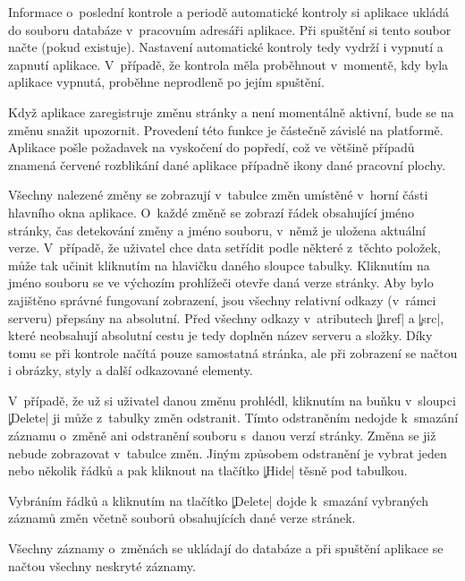 Informace o~poslední kontrole a periodě automatické kontroly si aplikace ukládá do souboru databáze v~pracovním adresáři aplikace.
Při spuštění si tento soubor načte (pokud existuje).
Nastavení automatické kontroly tedy vydrží i vypnutí a zapnutí aplikace.
V~případě, že kontrola měla proběhnout v~momentě, kdy byla aplikace vypnutá, proběhne neprodleně po jejím spuštění.

Když aplikace zaregistruje změnu stránky a není momentálně aktivní, bude se na změnu snažit upozornit.
Provedení této funkce je částečně závislé na platformě. 
Aplikace pošle požadavek na vyskočení do popředí, což ve většině případů znamená červené rozblikání dané aplikace případně ikony dané pracovní plochy.

Všechny nalezené změny se zobrazují v~tabulce změn umístěné v~horní části hlavního okna aplikace.
O~každé změně se zobrazí řádek obsahující jméno stránky, čas detekování změny a jméno souboru, v~němž je uložena aktuální verze.
V~případě, že uživatel chce data setřídit podle některé z~těchto položek, může tak učinit kliknutím na hlavičku daného sloupce tabulky.
Kliknutím na jméno souboru se ve výchozím prohlížeči otevře daná verze stránky.
Aby bylo zajištěno správné fungovaní zobrazení, jsou všechny relativní odkazy (v~rámci serveru) přepsány na absolutní.
Před všechny odkazy v~atributech \c|href| a \c|src|, které neobsahují absolutní cestu je tedy doplněn název serveru a složky.
Díky tomu se při kontrole načítá pouze samostatná stránka, ale při zobrazení se načtou i obrázky, styly a další odkazované elementy.

V~případě, že už si uživatel danou změnu prohlédl, kliknutím na buňku v~sloupci \c|Delete| ji může z~tabulky změn odstranit.
Tímto odstraněním nedojde k~smazání záznamu o~změně ani odstranění souboru s~danou verzí stránky.
Změna se již nebude zobrazovat v~tabulce změn.
Jiným způsobem odstranění je vybrat jeden nebo několik řádků a pak kliknout na tlačítko \c|Hide| těsně pod tabulkou.

Vybráním řádků a kliknutím na tlačítko \c|Delete| dojde k~smazání vybraných záznamů změn včetně souborů obsahujících dané verze stránek.

Všechny záznamy o~změnách se ukládají do databáze a při spuštění aplikace se načtou všechny neskryté záznamy. 
